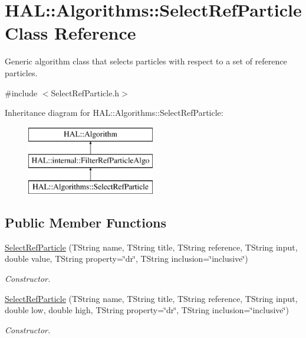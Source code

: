 \hypertarget{class_h_a_l_1_1_algorithms_1_1_select_ref_particle}{\section{H\+A\+L\+:\+:Algorithms\+:\+:Select\+Ref\+Particle Class Reference}
\label{class_h_a_l_1_1_algorithms_1_1_select_ref_particle}
}


Generic algorithm class that selects particles with respect to a set of reference particles.  




{\ttfamily \#include $<$Select\+Ref\+Particle.\+h$>$}

Inheritance diagram for H\+A\+L\+:\+:Algorithms\+:\+:Select\+Ref\+Particle\+:\begin{figure}[H]
\begin{center}
\leavevmode
\includegraphics[height=3.000000cm]{class_h_a_l_1_1_algorithms_1_1_select_ref_particle}
\end{center}
\end{figure}
\subsection*{Public Member Functions}
\begin{DoxyCompactItemize}
\item 
\hyperlink{class_h_a_l_1_1_algorithms_1_1_select_ref_particle_af0c5f5e66e54f7bc102e32148867892e}{Select\+Ref\+Particle} (T\+String name, T\+String title, T\+String reference, T\+String input, double value, T\+String property=\char`\"{}dr\char`\"{}, T\+String inclusion=\char`\"{}inclusive\char`\"{})
\begin{DoxyCompactList}\small\item\em Constructor. \end{DoxyCompactList}\item 
\hyperlink{class_h_a_l_1_1_algorithms_1_1_select_ref_particle_a68f9c3c857223c9a84b73e1569cdecaf}{Select\+Ref\+Particle} (T\+String name, T\+String title, T\+String reference, T\+String input, double low, double high, T\+String property=\char`\"{}dr\char`\"{}, T\+String inclusion=\char`\"{}inclusive\char`\"{})
\begin{DoxyCompactList}\small\item\em Constructor. \end{DoxyCompactList}\end{DoxyCompactItemize}
